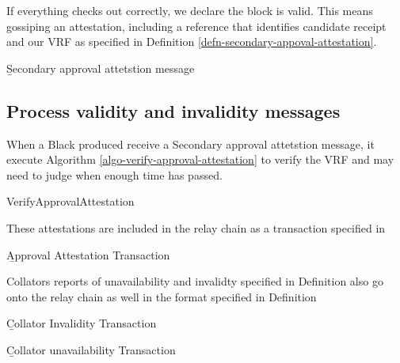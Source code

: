 {{\begin{algorithm}
\begin{algorithmic}[1]
    \State \TBS
  \end{algorithmic}
\end{algorithm}

If everything checks out correctly, we declare the block is valid. This means gossiping an attestation, including a reference that identifies candidate receipt and our VRF as specified in Definition \ref{defn-secondary-appoval-attestation}.

\begin{definition}
  \label{defn-secondary-appoval-attestation}
        {\b Secondary approval attetstion message} \TBS
\end{definition}


\subsection{Process validity and invalidity messages}
When a Black produced receive a Secondary approval attetstion message, it execute Algorithm \ref{algo-verify-approval-attestation} to verify the VRF and may need to judge when enough time has passed.

\begin{algorithm}
  \caption[]{\sc VerifyApprovalAttestation}
  \label{algo-verify-approval-attestation}
  \begin{algorithmic}[1]
    \Require{}
    
    \State \TBS
  \end{algorithmic}
\end{algorithm}

These attestations are included in the relay chain as a transaction specified in

\begin{definition}
  \label{defn-approval-attestation-transaction}
        {\b Approval Attestation Transaction} \TBS
\end{definition}

Collators reports of unavailability and invalidty specified in Definition  also  go onto the relay chain as well in the format specified in Definition

\begin{definition}
  \label{defn-collator-invalidity-transaction}
        {\b Collator Invalidity Transaction}
        \TBS
\end{definition}

\begin{definition}
  \label{defn-collator-unavailability-transaction}
        {\b Collator unavailability Transaction}
\end{definition}

}}
